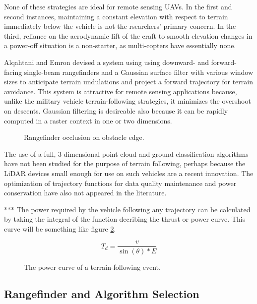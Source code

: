 \documentclass[10pt,a4paper]{report}
\begin{document}
None of these strategies are ideal for remote sensing UAVs. In the first and second instances, maintaining a constant elevation with respect to terrain immediately below the vehicle is not the rsearchers' primary concern. In the third, reliance on the aerodynamic lift of the craft to smooth elevation changes in a power-off situation is a non-starter, as multi-copters have essentially none.

Alqahtani and Emron \cite{Alqahtani2018} devised a system using using downward- and forward-facing single-beam rangefinders and a Gaussian surface filter with various window sizes to anticipate terrain undulations and project a forward trajectory for terrain avoidance. This system is attractive for remote sensing applications because, unlike the military vehicle terrain-following strategies, it minimizes the overshoot on descents. Gaussian filtering is desireable also because it can be rapidly computed in a raster context in one or two dimensions. 

\begin{figure}
\centering
\def\svgscale{0.8}

\caption{Rangefinder occlusion on obstacle edge.}
\label{fig:uav_edge_occlude}
\end{figure}

The use of a full, 3-dimensional point cloud and ground classification algorithms have not been studied for the purpose of terrain following, perhaps because the LiDAR devices small enough for use on such vehicles are a recent innovation. The optimization of trajectory functions for data quality maintenance and power conservation have also not appeared in the literature. 


*** The power required by the vehicle following any trajectory can be calculated by taking the integral of the function decribing the thrust or power curve. This curve will be something like figure \ref{fig:uav_power_curve}.


\begin{equation}
T_d = \dfrac{v}{\sin(\theta) * E}
\label{eq:decel}
\end{equation} 

\begin{figure}
\centering
\def\svgscale{0.8}

\caption{The power curve of a terrain-following event.}
\label{fig:uav_power_curve}
\end{figure}


\subsection{Rangefinder and Algorithm Selection}
\end{document}
